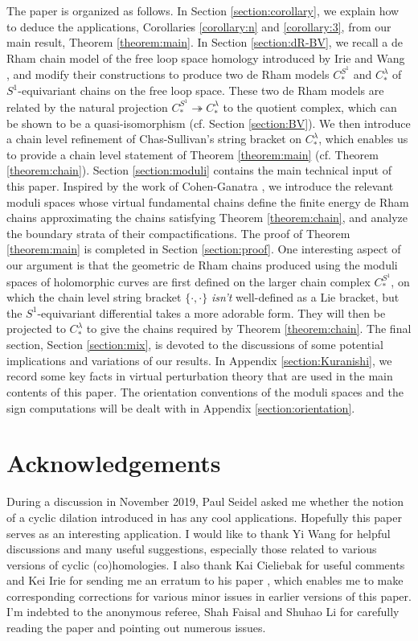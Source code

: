 \documentclass[a4paper]{article}
\numberwithin{equation}{section}
\begin{document}
The paper is organized as follows. In Section \ref{section:corollary}, we explain how to deduce the applications, Corollaries \ref{corollary:n} and \ref{corollary:3}, from our main result, Theorem \ref{theorem:main}. In Section \ref{section:dR-BV}, we recall a de Rham chain model of the free loop space homology introduced by Irie \cite{ki1} and Wang \cite{ywt}, and modify their constructions to produce two de Rham models $C_\ast^{S^1}$ and $C_\ast^\lambda$ of $S^1$-equivariant chains on the free loop space. These two de Rham models are related by the natural projection $C_\ast^{S^1}\twoheadrightarrow C_\ast^\lambda$ to the quotient complex, which can be shown to be a quasi-isomorphism (cf. Section \ref{section:BV}). We then introduce a chain level refinement of Chas-Sullivan's string bracket \cite{cs} on $C_\ast^\lambda$, which enables us to provide a chain level statement of Theorem \ref{theorem:main} (cf. Theorem \ref{theorem:chain}). Section \ref{section:moduli} contains the main technical input of this paper. Inspired by the work of Cohen-Ganatra \cite{cg}, we introduce the relevant moduli spaces whose virtual fundamental chains define the finite energy de Rham chains approximating the chains satisfying Theorem \ref{theorem:chain}, and analyze the boundary strata of their compactifications. The proof of Theorem \ref{theorem:main} is completed in Section \ref{section:proof}. One interesting aspect of our argument is that the geometric de Rham chains produced using the moduli spaces of holomorphic curves are first defined on the larger chain complex $C_\ast^{S^1}$, on which the chain level string bracket $\{\cdot,\cdot\}$ \textit{isn't} well-defined as a Lie bracket, but the $S^1$-equivariant differential takes a more adorable form. They will then be projected to $C_\ast^\lambda$ to give the chains required by Theorem \ref{theorem:chain}. The final section, Section \ref{section:mix}, is devoted to the discussions of some potential implications and variations of our results. In Appendix \ref{section:Kuranishi}, we record some key facts in virtual perturbation theory that are used in the main contents of this paper. The orientation conventions of the moduli spaces and the sign computations will be dealt with in Appendix \ref{section:orientation}.

\section*{Acknowledgements}
During a discussion in November 2019, Paul Seidel asked me whether the notion of a cyclic dilation introduced in \cite{yl2} has any cool applications. Hopefully this paper serves as an interesting application.  I would like to thank Yi Wang for helpful discussions and many useful suggestions, especially those related to various versions of cyclic (co)homologies. I also thank Kai Cieliebak for useful comments and Kei Irie for sending me an erratum to his paper \cite{ki2}, which enables me to make corresponding corrections for various minor issues in earlier versions of this paper. I'm indebted to the anonymous referee, Shah Faisal and Shuhao Li for carefully reading the paper and pointing out numerous issues.
\end{document}
